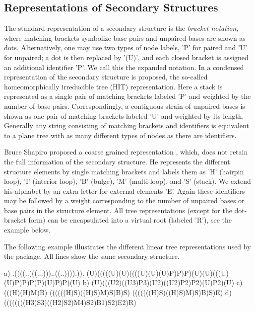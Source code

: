 \subsection*{Representations of Secondary Structures}

The standard representation of a secondary structure is the {\itshape bracket notation}, where matching brackets symbolize base pairs and unpaired bases are shown as dots. Alternatively, one may use two types of node labels, 'P' for paired and 'U' for unpaired; a dot is then replaced by '(U)', and each closed bracket is assigned an additional identifier 'P'. We call this the expanded notation. In \cite{fontana:1993b} a condensed representation of the secondary structure is proposed, the so-\/called homeomorphically irreducible tree (H\-I\-T) representation. Here a stack is represented as a single pair of matching brackets labeled 'P' and weighted by the number of base pairs. Correspondingly, a contiguous strain of unpaired bases is shown as one pair of matching brackets labeled 'U' and weighted by its length. Generally any string consisting of matching brackets and identifiers is equivalent to a plane tree with as many different types of nodes as there are identifiers.

Bruce Shapiro proposed a coarse grained representation \cite{shapiro:1988}, which, does not retain the full information of the secondary structure. He represents the different structure elements by single matching brackets and labels them as 'H' (hairpin loop), 'I' (interior loop), 'B' (bulge), 'M' (multi-\/loop), and 'S' (stack). We extend his alphabet by an extra letter for external elements 'E'. Again these identifiers may be followed by a weight corresponding to the number of unpaired bases or base pairs in the structure element. All tree representations (except for the dot-\/bracket form) can be encapsulated into a virtual root (labeled 'R'), see the example below.

The following example illustrates the different linear tree representations used by the package. All lines show the same secondary structure.

\begin{DoxyVerb}a) .((((..(((...)))..((..)))).)).
   (U)(((((U)(U)((((U)(U)(U)P)P)P)(U)(U)(((U)(U)P)P)P)P)(U)P)P)(U)
b) (U)(((U2)((U3)P3)(U2)((U2)P2)P2)(U)P2)(U)
c) (((H)(H)M)B)
   ((((((H)S)((H)S)M)S)B)S)
   (((((((H)S)((H)S)M)S)B)S)E)
d) ((((((((H3)S3)((H2)S2)M4)S2)B1)S2)E2)R)
\end{DoxyVerb}


